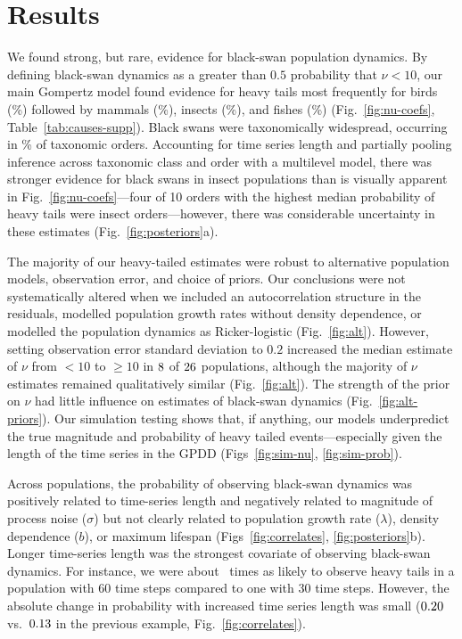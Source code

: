 \section{Results}

We found strong, but rare, evidence for black-swan population dynamics. By defining black-swan dynamics as a greater than $0.5$ probability that $\nu < 10$, our main Gompertz model found evidence for heavy tails most frequently for birds (\birdPH\%) followed by mammals (\mammalsPH\%), insects (\insectsPH\%), and fishes (\fishPH\%) (Fig.~\ref{fig:nu-coefs}, Table~\ref{tab:causes-supp}). Black swans were taxonomically widespread, occurring in \POrdersHeavy\% of taxonomic orders. Accounting for time series length and partially pooling inference across taxonomic class and order with a multilevel model, there was stronger evidence for black swans in insect populations than is visually apparent in Fig.~\ref{fig:nu-coefs}---four of 10 orders with the highest median probability of heavy tails were insect orders---however, there was considerable uncertainty in these estimates (Fig.~\ref{fig:posteriors}a).

The majority of our heavy-tailed estimates were robust to alternative population models, observation error, and choice of priors. Our conclusions were not systematically altered when we included an autocorrelation structure in the residuals, modelled population growth rates without density dependence, or modelled the population dynamics as Ricker-logistic (Fig.~\ref{fig:alt}). However, setting observation error standard deviation to $0.2$ increased the median estimate of $\nu$ from $<10$ to $\ge 10$ in $8$ of $26$ populations, although the majority of $\nu$ estimates remained qualitatively similar (Fig.~\ref{fig:alt}). The strength of the prior on $\nu$ had little influence on estimates of black-swan dynamics (Fig.~\ref{fig:alt-priors}). Our simulation testing shows that, if anything, our models underpredict the true magnitude and probability of heavy tailed events---especially given the length of the time series in the GPDD (Figs~\ref{fig:sim-nu}, \ref{fig:sim-prob}).

Across populations, the probability of observing black-swan dynamics was positively related to time-series length and negatively related to magnitude of process noise ($\sigma$) but not clearly related to population growth rate ($\lambda$), density dependence ($b$), or maximum lifespan (Figs~\ref{fig:correlates}, \ref{fig:posteriors}b). Longer time-series length was the strongest covariate of observing black-swan dynamics. For instance, we were about \pIncHeavyNThirtyNSixty~times as likely to observe heavy tails in a population with 60 time steps compared to one with 30 time steps. However, the absolute change in probability with increased time series length was small ($0.20$ vs.\ $0.13$ in the previous example, Fig.~\ref{fig:correlates}).

